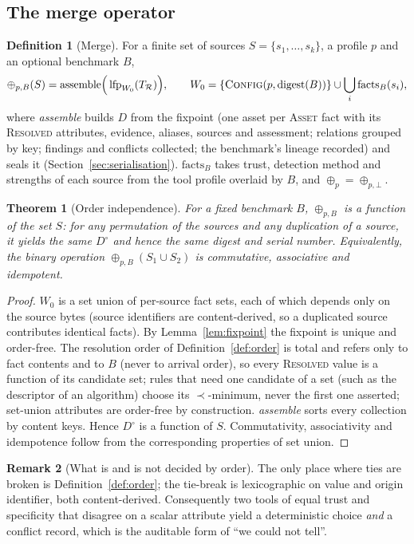 \documentclass[11pt,a4paper]{article}
\newcommand{\lfp}{\operatorname{lfp}}
\newcommand{\digest}{\operatorname{digest}}
\newcommand{\merge}{\oplus}
\theoremstyle{definition}
\newtheorem{definition}{Definition}[section]
\newtheorem{remark}[definition]{Remark}
\theoremstyle{plain}
\newtheorem{theorem}{Theorem}
\begin{document}
\subsection{The merge operator}
\begin{definition}[Merge]\label{def:merge}
For a finite set of sources $S = \{s_1,\dots,s_k\}$, a profile $p$ and an optional benchmark $B$,
$$\merge_{p,B}(S) = \mathrm{assemble}\Big(\lfp_{W_0}(T_{\mathcal R})\Big),\qquad
  W_0 = \{\textsc{Config}(p, \digest(B))\} \cup \bigcup_{i} \mathrm{facts}_B(s_i),$$
where \emph{assemble} builds $D$ from the fixpoint (one asset per \textsc{Asset} fact with its
\textsc{Resolved} attributes, evidence, aliases, sources and assessment; relations grouped by
key; findings and conflicts collected; the benchmark's lineage recorded) and seals it
(Section~\ref{sec:serialisation}). $\mathrm{facts}_B$ takes trust, detection method and strengths of
each source from the tool profile overlaid by $B$, and $\merge_p = \merge_{p,\bot}$.
\end{definition}

\begin{theorem}[Order independence]\label{thm:merge}
For a fixed benchmark $B$, $\merge_{p,B}$ is a function of the \emph{set} $S$: for any permutation of
the sources and any duplication of a source, it yields the same $D^{\circ}$ and hence the same digest
and serial number. Equivalently, the binary operation $\merge_{p,B}(S_1 \cup S_2)$ is commutative,
associative and idempotent.
\end{theorem}
\begin{proof}
$W_0$ is a set union of per-source fact sets, each of which depends only on the source bytes
(source identifiers are content-derived, so a duplicated source contributes identical facts).
By Lemma~\ref{lem:fixpoint} the fixpoint is unique and order-free. The resolution order of
Definition~\ref{def:order} is total and refers only to fact contents and to $B$ (never to arrival
order), so every \textsc{Resolved} value is a function of its candidate set; rules that need one
candidate of a set (such as the descriptor of an algorithm) choose its $\prec$-minimum, never the
first one asserted; set-union attributes are
order-free by construction. \emph{assemble} sorts every collection by content keys. Hence
$D^{\circ}$ is a function of $S$. Commutativity, associativity and idempotence follow from the
corresponding properties of set union.
\end{proof}

\begin{remark}[What is and is not decided by order]
The only place where ties are broken is Definition~\ref{def:order}; the tie-break is
lexicographic on value and origin identifier, both content-derived. Consequently two tools of
equal trust and specificity that disagree on a scalar attribute yield a deterministic choice
\emph{and} a conflict record, which is the auditable form of ``we could not tell''.
\end{remark}
\end{document}
